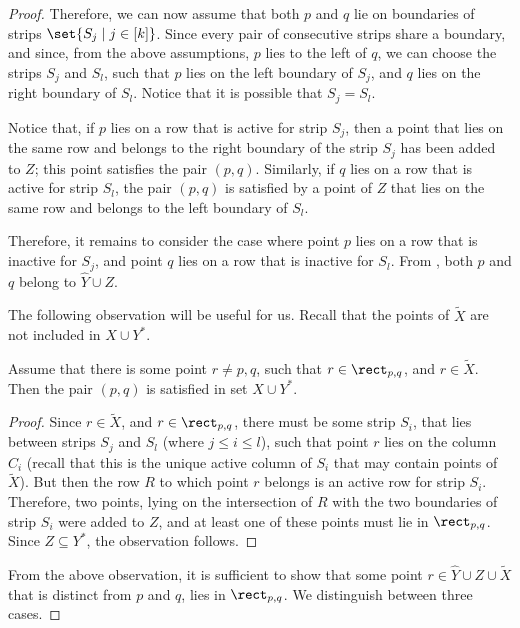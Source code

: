 \begin{proof}
Therefore, we can now assume that both $p$ and $q$ lie on boundaries of strips $\set{S_j \mid j \in [k]}$. Since every pair of consecutive strips share a boundary, and since, from the above assumptions, $p$ lies to the left of $q$, we can choose the strips $S_j$ and $S_{l}$, such that $p$ lies on the left boundary of $S_j$, and $q$ lies on the right boundary of $S_{l}$. Notice that it is possible that $S_j=S_{l}$.

Notice that, if $p$ lies on a row that is active for strip $S_j$, then a point that lies on the same row and belongs to the right boundary of the strip $S_j$ has been added to $Z$; this point satisfies the pair $(p,q)$. Similarly, if $q$ lies on a row that is active for strip $S_{l}$, the pair $(p,q)$ is satisfied by a point of $Z$ that lies on the same row and belongs to the left boundary of $S_{l}$.

Therefore, it remains to consider the case where point $p$ lies on a row that is inactive for $S_j$, and point $q$ lies on a row that is inactive for $S_{l}$. From , both $p$ and $q$ belong to $\hat Y\cup Z$.

The following observation will be useful for us. Recall that the points of $\widetilde{X}$ are not included in $X\cup Y^*$.

\begin{myobs}\label{obs: satisfied by Xc}
	Assume that there is some point $r\neq p,q$, such that $r\in \rect_{p,q}$, and $r\in \widetilde{X}$. Then the pair $(p,q)$ is satisfied in set $X\cup Y^*$.
	\end{myobs}
\begin{proof}
	Since $r\in \widetilde{X}$, and $r\in \rect_{p,q}$, there must be some strip $S_i$, that lies between strips $S_j$ and $S_{l}$ (where $j \leq i \leq l$), such that point $r$ lies on the column $C_i$ (recall that this is the unique active column of $S_i$ that may contain points of $\widetilde{X}$). But then the row $R$ to which point $r$ belongs is an active row for strip $S_i$. Therefore, two  points, lying on the intersection of $R$ with the two boundaries of strip $S_i$ were added to $Z$, and at least one of these points must lie in $\rect_{p,q}$. Since $Z\subseteq Y^*$, the observation follows.
\end{proof}



From the above observation, it is sufficient to show that some point $r\in \hat Y\cup Z\cup \widetilde{X}$ that is distinct from $p$ and $q$, lies in $\rect_{p,q}$.
We distinguish between three cases.


\end{proof}
